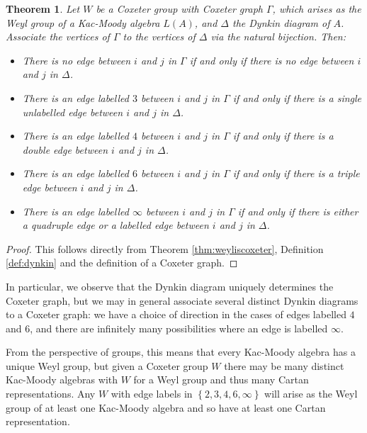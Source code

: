 \documentclass[11pt,a4paper]{report}
\newtheorem{theorem}{Theorem}[chapter]
\theoremstyle{definition}
\begin{document}
\begin{theorem} Let $W$ be a Coxeter group with Coxeter graph $\Gamma$, which arises as the Weyl group of a Kac-Moody algebra $L(A)$, and $\Delta$ the Dynkin diagram of $A$. Associate the vertices of $\Gamma$ to the vertices of $\Delta$ via the natural bijection. Then:
\begin{itemize}
\item There is no edge between $i$ and $j$ in $\Gamma$ if and only if there is no edge between $i$ and $j$ in $\Delta$.

\item There is an edge labelled $3$ between $i$ and $j$ in $\Gamma$ if and only if there is a single unlabelled edge between $i$ and $j$ in $\Delta$.

\item There is an edge labelled $4$ between $i$ and $j$ in $\Gamma$ if and only if there is a double edge between $i$ and $j$ in $\Delta$.

\item There is an edge labelled $6$ between $i$ and $j$ in $\Gamma$ if and only if there is a triple edge between $i$ and $j$ in $\Delta$.

\item There is an edge labelled $\infty$ between $i$ and $j$ in $\Gamma$ if and only if there is either a quadruple edge or a labelled edge between $i$ and $j$ in $\Delta$.
\end{itemize} 
\end{theorem}

\begin{proof}This follows directly from Theorem \ref{thm:weyliscoxeter}, Definition \ref{def:dynkin} and the definition of a Coxeter graph.\end{proof}

In particular, we observe that the Dynkin diagram uniquely determines the Coxeter graph, but we may in general associate several distinct Dynkin diagrams to a Coxeter graph: we have a choice of direction in the cases of edges labelled $4$ and $6$, and there are infinitely many possibilities where an edge is labelled $\infty$.

From the perspective of groups, this means that every Kac-Moody algebra has a unique Weyl group, but given a Coxeter group $W$ there may be many distinct Kac-Moody algebras with $W$ for a Weyl group and thus many Cartan representations. Any $W$ with edge labels in $\left\{2,3,4,6,\infty\right\}$ will arise as the Weyl group of at least one Kac-Moody algebra and so have at least one Cartan representation. 
\end{document}
